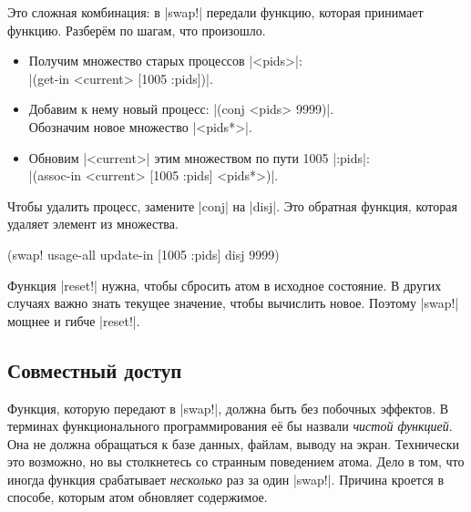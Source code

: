 Это сложная комбинация: в \spverb|swap!| передали функцию, которая принимает
функцию. Разберём по шагам, что произошло.

\begin{itemize}

\item
  Получим множество старых процессов \spverb|<pids>|:\\
  \spverb|(get-in <current> [1005 :pids])|.

\item
  Добавим к нему новый процесс: \spverb|(conj <pids> 9999)|.\\
  Обозначим новое множество \spverb|<pids*>|.

\item
  Обновим \spverb|<current>| этим множеством по пути 1005 \arr{} \spverb|:pids|:\\
  \spverb|(assoc-in <current> [1005 :pids] <pids*>)|.

\end{itemize}

\noindent
Чтобы удалить процесс, замените \spverb|conj| на \spverb|disj|. Это обратная
функция, которая удаляет элемент из множества.


\begin{english}
  \begin{clojure}
(swap! usage-all update-in [1005 :pids] disj 9999)
  \end{clojure}
\end{english}

Функция \spverb|reset!| нужна, чтобы сбросить атом в исходное состояние. В
других случаях важно знать текущее значение, чтобы вычислить новое. Поэтому
\spverb|swap!| мощнее и гибче \spverb|reset!|.

\subsection{Совместный доступ}


Функция, которую передают в \spverb|swap!|, должна быть без побочных эффектов. В
терминах функционального программирования её бы назвали \emph{чистой функцией}.
Она не должна обращаться к базе данных, файлам, выводу на экран. Технически
это возможно, но вы столкнетесь со странным поведением атома. Дело в том,
что иногда функция срабатывает \emph{несколько} раз за один \spverb|swap!|.
Причина кроется в способе, которым атом обновляет содержимое.

